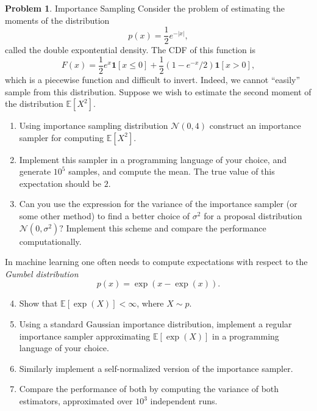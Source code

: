 \documentclass[11pt,a4paper]{article}
\theoremstyle{definition}
\newtheorem{problem}{Problem}
\theoremstyle{plain}
\begin{document}
\begin{problem}{Importance Sampling}
Consider the problem of estimating the moments of the distribution
$$
  p(x) = \frac{1}{2}e^{-|x|},
$$
called the double expontential density.  The CDF of this function is
$$
  F(x) = \frac{1}{2}e^{x}\mathbf{1}[x \leq 0] + \frac{1}{2}(1-e^{-x}/2)\mathbf{1}[x > 0],
$$
which is a piecewise function and difficult to invert.  Indeed, we cannot ``easily'' sample from this distribution.   Suppose we wish to estimate the second moment of the distribution $\mathbb{E}[X^2]$.
\begin{enumerate}
\item Using importance sampling distribution $\mathcal{N}(0, 4)$ construct an importance sampler for computing $\mathbb{E}[X^2]$.
\item Implement this sampler in a programming language of your choice, and generate $10^5$ samples, and compute the mean.  The true value of this expectation should be $2$.
\item Can you use the expression for the variance of the importance sampler (or some other method) to find a better choice of $\sigma^2$ for a proposal distribution $\mathcal{N}(0, \sigma^2)?$ Implement this scheme and compare the performance computationally.
\end{enumerate}

In machine learning one often needs to compute expectations with respect to the \emph{Gumbel distribution}
$$
  p(x) = \exp(x-  \exp(x)).
$$

\begin{enumerate}
  \setcounter{enumi}{3}
\item Show that $\mathbb{E}[\exp(X)] < \infty$, where $X \sim p$.
\item Using a standard Gaussian importance distribution, implement a regular importance sampler approximating $\mathbb{E}[\exp(X)]$ in a programming language of your choice.
\item Similarly implement a self-normalized version of the importance sampler.
\item Compare the performance of both by computing the variance of both estimators, approximated over $10^3$ independent runs.
\end{enumerate}
\end{problem}
\end{document}

